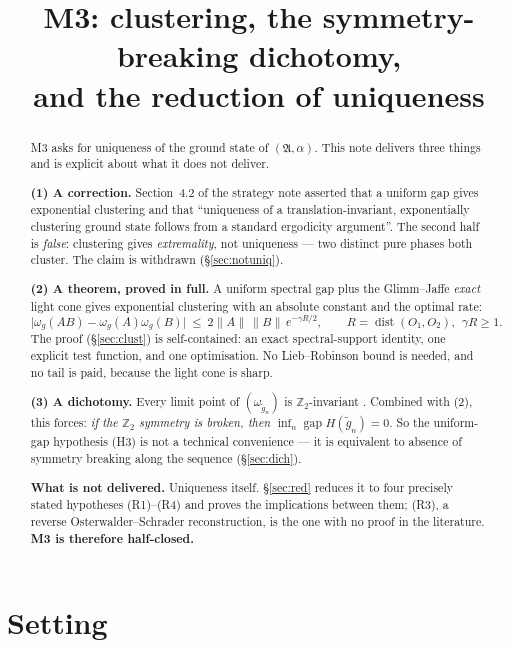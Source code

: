 \documentclass[11pt,a4paper]{article}
\title{M3: clustering, the symmetry-breaking dichotomy,\\ and the reduction of uniqueness}
\author{}
\date{}
\theoremstyle{plain}
\theoremstyle{definition}
\newcommand{\A}{\mathfrak{A}}
\newcommand{\Z}{\mathbb{Z}}
\DeclareMathOperator{\dist}{dist}
\DeclareMathOperator{\gapop}{gap}
\begin{document}
\maketitle

\begin{abstract}
M3 asks for uniqueness of the ground state of $(\A,\alpha)$. This note delivers three things and
is explicit about what it does not deliver.

\smallskip
\noindent\textbf{(1) A correction.} Section~4.2 of the strategy note asserted that a uniform gap
gives exponential clustering and that ``uniqueness of a translation-invariant, exponentially
clustering ground state follows from a standard ergodicity argument''. The second half is
\emph{false}: clustering gives \emph{extremality}, not uniqueness --- two distinct pure phases both
cluster. The claim is withdrawn (\S\ref{sec:notuniq}).

\smallskip
\noindent\textbf{(2) A theorem, proved in full.} A uniform spectral gap plus the Glimm--Jaffe
\emph{exact} light cone gives exponential clustering with an absolute constant and the optimal
rate:
\[
  \bigl|\omega_g(AB)-\omega_g(A)\omega_g(B)\bigr|\ \le\ 2\|A\|\,\|B\|\,e^{-\gamma R/2},
  \qquad R=\dist(O_1,O_2),\ \ \gamma R\ge1 .
\]
The proof (\S\ref{sec:clust}) is self-contained: an exact spectral-support identity, one explicit
test function, and one optimisation. No Lieb--Robinson bound is needed, and no tail is paid,
because the light cone is sharp.

\smallskip
\noindent\textbf{(3) A dichotomy.} Every limit point of $(\omega_{\tilde g_n})$ is
$\Z_2$-invariant \cite[Lem.~3.3]{M0}. Combined with (2), this forces: \emph{if the $\Z_2$
symmetry is broken, then $\inf_n\gapop H(\tilde g_n)=0$}. So the uniform-gap hypothesis (H3) is not
a technical convenience --- it is equivalent to absence of symmetry breaking along the sequence
(\S\ref{sec:dich}).

\smallskip
\noindent\textbf{What is not delivered.} Uniqueness itself. \S\ref{sec:red} reduces it to four
precisely stated hypotheses (R1)--(R4) and proves the implications between them; (R3), a reverse
Osterwalder--Schrader reconstruction, is the one with no proof in the literature.
\textbf{M3 is therefore half-closed.}
\end{abstract}

\section{Setting}
\end{document}
